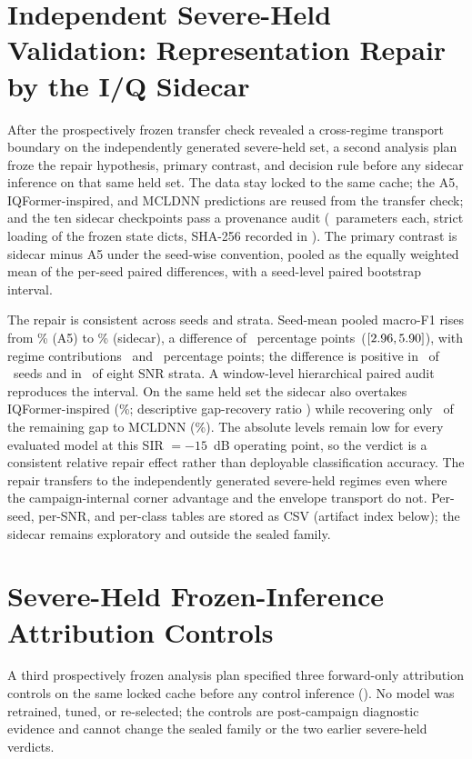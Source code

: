 \documentclass[letterpaper,onecolumn,11pt,journal]{IEEEtran}
\newcommand{\pp}{percentage points}
\begin{document}
\section{Independent Severe-Held Validation: Representation Repair by the
I/Q Sidecar}
After the prospectively frozen transfer check revealed a cross-regime transport
boundary on the independently generated severe-held set, a second analysis
plan froze the repair hypothesis, primary contrast, and decision
rule before any sidecar inference on that same held set. The data stay locked
to the same cache; the A5, IQFormer-inspired, and MCLDNN predictions are
reused from the transfer check; and the ten sidecar checkpoints pass a
provenance audit (\SidecarParameters\ parameters each, strict loading of the
frozen state dicts, SHA-256 recorded in
). The primary contrast is sidecar
minus A5 under the seed-wise convention, pooled as the equally weighted mean
of the per-seed paired differences, with a seed-level paired bootstrap
interval.

The repair is consistent across seeds and strata. Seed-mean pooled macro-F1
rises from \SevereRepairLevelAFive\%
(A5) to \SevereRepairLevelSidecar\% (sidecar), a difference of
\SevereRepairDiff\ \pp\ ($[2.96,5.90]$), with
regime contributions \SevereRepairRegimeOneDiff\ and
\SevereRepairRegimeTwoDiff\ \pp; the difference is positive in
\SevereRepairPositiveSeeds\ of \ProtocolSeedCount\ seeds and in
\SevereRepairPositiveSnrStrata\ of eight SNR strata. A window-level
hierarchical paired audit reproduces the interval. On the same held set the
sidecar also overtakes IQFormer-inspired (\SevereRepairLevelIqformer\%;
descriptive gap-recovery ratio \SevereRepairGapRecoveryIqformer) while
recovering only \SevereRepairGapRecoveryMcldnn\ of the remaining gap to
MCLDNN (\SevereRepairLevelMcldnn\%). The absolute levels remain low for every
evaluated model at this SIR $=-15$~dB operating point, so the verdict is a
consistent relative repair effect rather than deployable classification
accuracy. The repair transfers to the independently generated severe-held
regimes even where the campaign-internal corner advantage and the envelope
transport do not. Per-seed, per-SNR, and per-class tables are stored as CSV
(artifact index below); the sidecar remains exploratory and outside the
sealed family.

\section{Severe-Held Frozen-Inference Attribution Controls}
\label{sec:controls}
A third prospectively frozen analysis plan specified three forward-only
attribution controls on the
same locked cache before any control inference
(). No model was
retrained, tuned, or re-selected; the controls are post-campaign diagnostic
evidence and cannot change the sealed family or the two earlier severe-held
verdicts.
\end{document}

